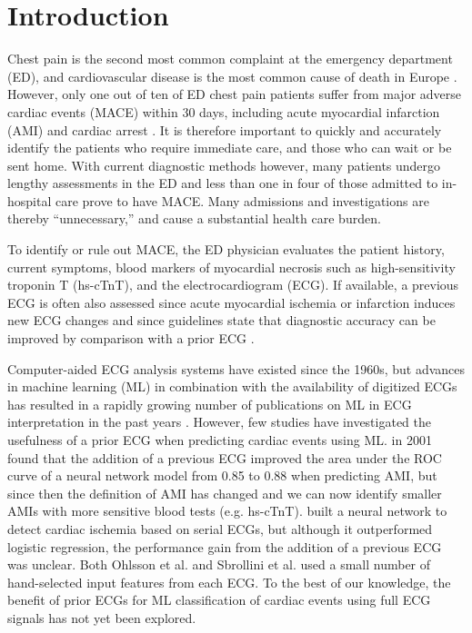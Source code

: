 \documentclass[preprint]{elsarticle}
\begin{document}


\section{Introduction}
\label{sec:introduction}
Chest pain is the second most common complaint at the emergency department (ED), and cardiovascular disease is the most common cause of death in Europe \citep{timmis2022}. However, only one out of ten of ED chest pain patients suffer from major adverse cardiac events (MACE) within 30 days, including acute myocardial infarction (AMI) and cardiac arrest \citep{mokhtari2016}. It is therefore important to quickly and accurately identify the patients who require immediate care, and those who can wait or be sent home. With current diagnostic methods however, many patients undergo lengthy assessments in the ED and less than one in four of those admitted to in-hospital care prove to have MACE. Many admissions and investigations are thereby “unnecessary,” and cause a substantial health care burden.

To identify or rule out MACE, the ED physician evaluates the patient history, current symptoms, blood markers of myocardial necrosis such as high-sensitivity troponin T (hs-cTnT), and the electrocardiogram (ECG). If available, a previous ECG is often also assessed since acute myocardial ischemia or infarction induces new ECG changes and since guidelines state that diagnostic accuracy can be improved by comparison with a prior ECG \citep{anderson2013,lee1990}.

Computer-aided ECG analysis systems have existed since the 1960s, but advances in machine learning (ML) in combination with the availability of digitized ECGs has resulted in a rapidly growing number of publications on ML in ECG interpretation in the past years \citep{pipberger1961,ansari2017,liu2021}. However, few studies have investigated the usefulness of a prior ECG when predicting cardiac events using ML. \citet{ohlsson2001} in 2001 found that the addition of a previous ECG improved the area under the ROC curve of a neural network model from 0.85 to 0.88 when predicting AMI, but since then the definition of AMI has changed and we can now identify smaller AMIs with more sensitive blood tests (e.g. hs-cTnT). \citet{sbrollini2019} built a neural network to detect cardiac ischemia based on serial ECGs, but although it outperformed logistic regression, the performance gain from the addition of a previous ECG was unclear. Both Ohlsson et al. and Sbrollini et al. used a small number of hand-selected input features from each ECG. To the best of our knowledge, the benefit of prior ECGs for ML classification of cardiac events using full ECG signals has not yet been explored.
\end{document}
